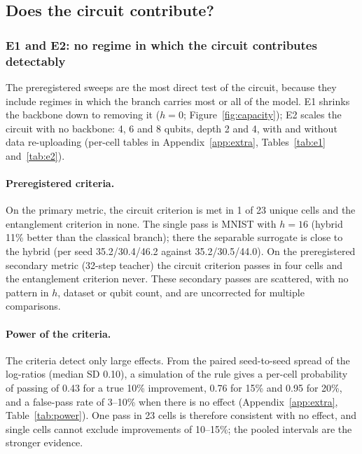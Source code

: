 \documentclass[11pt]{article}
\begin{document}
\subsection{Does the circuit contribute?}
\label{sec:res-circuit}

\subsubsection{E1 and E2: no regime in which the circuit contributes detectably}
\label{sec:res-sweeps}

The preregistered sweeps are the most direct test of the circuit, because they
include regimes in which the branch carries most or all of the model. E1 shrinks
the backbone down to removing it ($h=0$; Figure~\ref{fig:capacity}); E2 scales the
circuit with no backbone: 4, 6 and 8 qubits, depth 2 and 4, with and without data
re-uploading (per-cell tables in Appendix~\ref{app:extra},
Tables~\ref{tab:e1} and~\ref{tab:e2}).

\paragraph{Preregistered criteria.} On the primary metric, the circuit criterion
is met in 1 of 23 unique cells and the entanglement criterion in none. The single
pass is MNIST with $h=16$ (hybrid 11\% better than the classical branch); there the
separable surrogate is close to the hybrid (per seed 35.2/30.4/46.2 against
35.2/30.5/44.0). On the preregistered secondary metric (32-step teacher) the circuit
criterion passes in four cells and the entanglement criterion never. These secondary
passes are scattered, with no pattern in $h$, dataset or qubit count, and are
uncorrected for multiple comparisons.

\paragraph{Power of the criteria.} The criteria detect only large effects. From
the paired seed-to-seed spread of the log-ratios (median SD 0.10), a simulation of
the rule gives a per-cell probability of passing of 0.43 for a true 10\%
improvement, 0.76 for 15\% and 0.95 for 20\%, and a false-pass rate of 3--10\%
when there is no effect (Appendix~\ref{app:extra}, Table~\ref{tab:power}). One pass
in 23 cells is therefore consistent with no effect, and single cells cannot
exclude improvements of 10--15\%; the pooled intervals are the stronger evidence.
\end{document}
